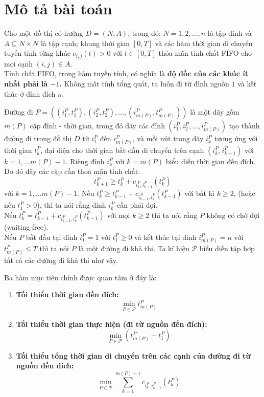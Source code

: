 \documentclass[../main.tex]{subfiles}
\begin{document}
\frontmatter
\pagestyle{empty}
\mainmatter
\pagestyle{fancy}
\chapter{Mô tả bài toán}\label{problem-description}

Cho một đồ thị có hướng \(D = (N, A)\), trong đó: \(N = {1, 2, ..., n}\)
là tập đỉnh và \(A \subseteq N \times N\) là tập cạnh; khung thời gian
\([0, T]\) và các hàm thời gian di chuyển tuyến tính từng khúc
\(c_{i,j}(t) > 0\) với \(t \in [0, T]\) thỏa mãn tính chất FIFO cho mọi
cạnh \((i, j) \in A\).\\
Tính chất FIFO, trong hàm tuyến tính, có nghĩa là
\textbf{độ dốc của các khúc ít nhất phải là \(-1\).} Không mất tính tổng
quát, ta luôn đi từ đỉnh nguồn \(1\) và kết thúc ở đỉnh đích
\(n\).

Đường đi
\(P=((i_1^P, t_1^P), (i_2^P, t_2^P), \dots, (i_{m(P)}^P, t_{m(P)}^P))\)
là một dãy gồm \(m(P)\) cặp đỉnh - thời gian, trong đó dãy các đỉnh
\((i_1^P, i_2^P, \dots, i_{m(P)}^P)\) tạo thành đường đi trong đồ thị
\(D\) từ \(i_1^P\) đến \(i_{m(P)}^P\), và mỗi nút trong dãy \(i_k^P\)
tương ứng với thời gian \(t_k^P\), đại diện cho thời gian bắt đầu di
chuyển trên cạnh \((i_k^P, i_{k+1}^P)\) với \(k=1, \dots m(P)-1\). Riêng
đỉnh \(i_k^P\) với \(k=m(P)\) biểu diễn thời gian đến đích. Do đó dãy
các cặp cần thoả mãn tính chất:
\[t_{k+1}^P \ge t_k^P + c_{i_k^P, i_{k+1}^P}(t_k^P)\] với
\(k=1, \dots m(P)-1\). Nếu
\(t_{k}^P \ge t_{k-1}^P + c_{i_{k-1}^P, i_{k}^P}(t_{k-1}^P)\) với bất kì
\(k \ge 2\), (hoặc nếu \(t_1^P > 0\)), thì ta nói rằng đỉnh \(i_k^P\)
cần phải đợi.\\ 
Nếu \(t_{k}^P = t_{k-1}^P + c_{i_{k-1}^P, i_{k}^P}(t_{k-1}^P)\) với mọi
\(k \ge 2\) thì ta nói rằng \(P\) không có chờ đợi (waiting-free). \\
Nếu \(P\) bắt đầu tại đỉnh \(i_1^P = 1\) với \(t_1^P\ge0\) và kết thúc tại
đỉnh \(i_{m(P)}^P=n\) với \(t_{m(P)}^P \le T\) thì ta nói \(P\) là một
đường đi khả thi. Ta kí hiệu \(\mathcal{P}\) biểu diễn tập hợp tất cả các
đường đi khả thi như vậy.

Ba hàm mục tiêu chính được quan tâm ở đây là:

\begin{enumerate}
\def\labelenumi{\arabic{enumi}.}
\tightlist
\item
  \textbf{Tối thiểu thời gian đến đích:}
  \[\min_{P\in \mathcal P}t_{m(P)}^P\]
\item
  \textbf{Tối thiểu thời gian thực hiện (đi từ nguồn đến đích):}
  \[\min_{P\in \mathcal P}(t_{m(P)}^P-t_1^P)\]
\item
  \textbf{Tối thiểu tổng thời gian di chuyển trên các cạnh của đường đi
  từ nguồn đến đích:}
  \[\min_{P\in \mathcal P}\sum_{k=1}^{m(P)-1}c_{i_k^P, i_{k+1}^P}(t_k^P)\]
\end{enumerate}
\end{document}
